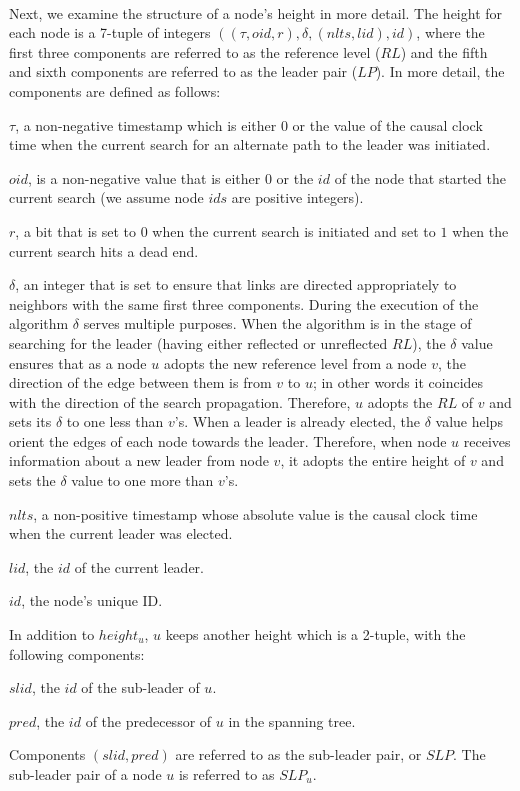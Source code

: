 \paragraph{}Next, we examine the structure of a node’s height in more detail. The height for each node is a 7-tuple of integers $((\tau , oid, r), \delta , (nlts, lid), id)$, where the first three components are referred to as the reference level ($RL$) and the fifth and sixth components are referred to as the leader pair ($LP$). In more detail, the components are defined as follows:
\begin{list}{--}{}
	\item $\tau$, a non-negative timestamp which is either $0$ or the value of the causal clock time when the current search for an alternate path to the leader was initiated.
	\item $oid$, is a non-negative value that is either $0$ or the $id$ of the node that started the current search (we assume node $ids$ are positive integers).
	\item $r$, a bit that is set to $0$ when the current search is initiated and set to $1$ when the current search hits a dead end.
	\item  $\delta$, an integer that is set to ensure that links are directed appropriately to neighbors with the same first three components. During the execution of the algorithm $\delta$ serves multiple purposes. When the algorithm is in the stage of searching for the leader (having either reflected or unreflected $RL$), the $\delta$ value ensures that as a node $u$ adopts the new reference level from a node $v$, the direction of the edge between them is from $v$ to $u$; in other words it coincides with the direction of the search propagation. Therefore, $u$ adopts the $RL$ of $v$ and sets its $\delta$ to one less than $v$’s. When a leader is already elected, the $\delta$ value helps orient the edges of each node towards the leader. Therefore, when node $u$ receives information about a new leader from node $v$, it adopts the entire height of $v$ and sets the $\delta$ value to one more than $v$’s.
	\item $nlts$, a non-positive timestamp whose absolute value is the causal clock time when the current leader was elected.
	\item $lid$, the $id$ of the current leader.
	\item $id$, the node’s unique ID.
\end{list}
In addition to $height_u$, $u$ keeps another height which is a 2-tuple, with the following components:
\begin{list}{--}{}
	\item $slid$, the $id$ of the sub-leader of $u$.
	\item $pred$, the $id$ of the predecessor of $u$ in the spanning tree.
\end{list}
Components $(slid, pred)$ are referred to as the sub-leader pair, or $SLP$. The sub-leader pair of a node $u$ is referred to as $SLP_u$.
